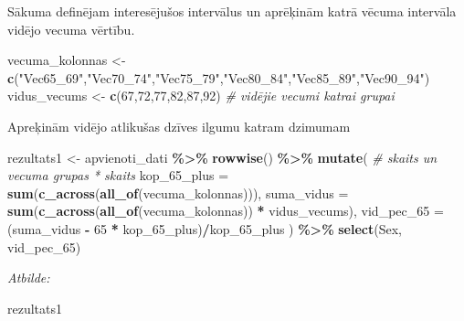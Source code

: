 \documentclass[
]{article}
\newenvironment{Shaded}{\begin{snugshade}}{\end{snugshade}}
\newcommand{\AttributeTok}[1]{\textcolor[rgb]{0.13,0.29,0.53}{#1}}
\newcommand{\CommentTok}[1]{\textcolor[rgb]{0.56,0.35,0.01}{\textit{#1}}}
\newcommand{\DecValTok}[1]{\textcolor[rgb]{0.00,0.00,0.81}{#1}}
\newcommand{\FunctionTok}[1]{\textcolor[rgb]{0.13,0.29,0.53}{\textbf{#1}}}
\newcommand{\NormalTok}[1]{#1}
\newcommand{\OtherTok}[1]{\textcolor[rgb]{0.56,0.35,0.01}{#1}}
\newcommand{\SpecialCharTok}[1]{\textcolor[rgb]{0.81,0.36,0.00}{\textbf{#1}}}
\newcommand{\StringTok}[1]{\textcolor[rgb]{0.31,0.60,0.02}{#1}}
\begin{document}
Sākuma definējam interesējušos intervālus un aprēķinām katrā vēcuma
intervāla vidējo vecuma vērtību.

\begin{Shaded}
\begin{Highlighting}[]
\NormalTok{vecuma\_kolonnas }\OtherTok{\textless{}{-}} \FunctionTok{c}\NormalTok{(}\StringTok{"Vec65\_69"}\NormalTok{,}\StringTok{"Vec70\_74"}\NormalTok{,}\StringTok{"Vec75\_79"}\NormalTok{,}\StringTok{"Vec80\_84"}\NormalTok{,}\StringTok{"Vec85\_89"}\NormalTok{,}\StringTok{"Vec90\_94"}\NormalTok{)}
\NormalTok{vidus\_vecums }\OtherTok{\textless{}{-}} \FunctionTok{c}\NormalTok{(}\DecValTok{67}\NormalTok{,}\DecValTok{72}\NormalTok{,}\DecValTok{77}\NormalTok{,}\DecValTok{82}\NormalTok{,}\DecValTok{87}\NormalTok{,}\DecValTok{92}\NormalTok{)  }\CommentTok{\# vidējie vecumi katrai grupai}
\end{Highlighting}
\end{Shaded}

Apreķinām vidējo atlikušas dzīves ilgumu katram dzimumam

\begin{Shaded}
\begin{Highlighting}[]
\NormalTok{rezultats1 }\OtherTok{\textless{}{-}}\NormalTok{ apvienoti\_dati }\SpecialCharTok{\%\textgreater{}\%}
  \FunctionTok{rowwise}\NormalTok{() }\SpecialCharTok{\%\textgreater{}\%}
  \FunctionTok{mutate}\NormalTok{(}
    \CommentTok{\# skaits un vecuma grupas * skaits}
    \AttributeTok{kop\_65\_plus =} \FunctionTok{sum}\NormalTok{(}\FunctionTok{c\_across}\NormalTok{(}\FunctionTok{all\_of}\NormalTok{(vecuma\_kolonnas))),}
    \AttributeTok{suma\_vidus =} \FunctionTok{sum}\NormalTok{(}\FunctionTok{c\_across}\NormalTok{(}\FunctionTok{all\_of}\NormalTok{(vecuma\_kolonnas)) }\SpecialCharTok{*}\NormalTok{ vidus\_vecums),}
    \AttributeTok{vid\_pec\_65 =}\NormalTok{ (suma\_vidus }\SpecialCharTok{{-}} \DecValTok{65} \SpecialCharTok{*}\NormalTok{ kop\_65\_plus)}\SpecialCharTok{/}\NormalTok{kop\_65\_plus}
\NormalTok{  ) }\SpecialCharTok{\%\textgreater{}\%}
  \FunctionTok{select}\NormalTok{(Sex, vid\_pec\_65)}
\end{Highlighting}
\end{Shaded}

\emph{Atbilde:}

\begin{Shaded}
\begin{Highlighting}[]
\NormalTok{rezultats1}
\end{Highlighting}
\end{Shaded}
\end{document}
